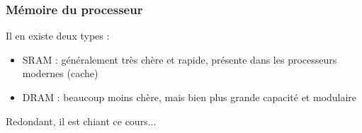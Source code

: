 \documentclass{article}
\begin{document}
        \subsubsection{Mémoire du processeur}
            Il en existe deux types :
            \begin{itemize}
                \item SRAM : généralement très chère et rapide, présente dans les processeurs modernes (cache)
                \item DRAM : beaucoup moins chère, mais bien plus grande capacité et modulaire
            \end{itemize}
Redondant, il est chiant ce cours...
\end{document}

